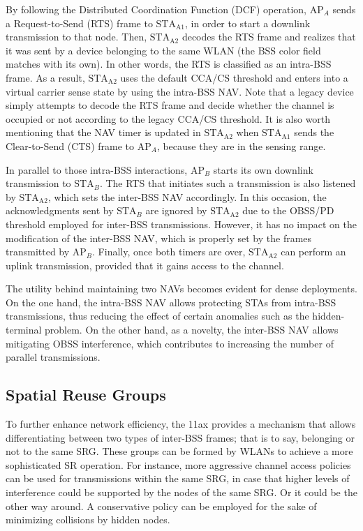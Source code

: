 \documentclass[comsoc]{IEEEtran}
\begin{document}
	By following the Distributed Coordination Function (DCF) operation, $\text{AP}_A$ sends a Request-to-Send (RTS) frame to $\text{STA}_\text{A1}$, in order to start a downlink transmission to that node. Then, $\text{STA}_\text{A2}$ decodes the RTS frame and realizes that it was sent by a device belonging to the same WLAN (the BSS color field matches with its own). In other words, the RTS is classified as an intra-BSS frame. As a result, $\text{STA}_\text{A2}$ uses the default CCA/CS threshold and enters into a virtual carrier sense state by using the intra-BSS NAV. Note that a legacy device simply attempts to decode the RTS frame and decide whether the channel is occupied or not according to the legacy CCA/CS threshold. It is also worth mentioning that the NAV timer is updated in $\text{STA}_\text{A2}$ when $\text{STA}_\text{A1}$ sends the Clear-to-Send (CTS) frame to $\text{AP}_A$, because they are in the sensing range. 
	
	In parallel to those intra-BSS interactions, $\text{AP}_B$ starts its own downlink transmission to $\text{STA}_B$. The RTS that initiates such a transmission is also listened by $\text{STA}_\text{A2}$, which sets the inter-BSS NAV accordingly. In this occasion, the acknowledgments sent by $\text{STA}_B$ are ignored by $\text{STA}_\text{A2}$ due to the OBSS/PD threshold employed for inter-BSS transmissions. However, it has no impact on the modification of the inter-BSS NAV, which is properly set by the frames transmitted by $\text{AP}_B$. Finally, once both timers are over, $\text{STA}_\text{A2}$ can perform an uplink transmission, provided that it gains access to the channel.
	
	The utility behind maintaining two NAVs becomes evident for dense deployments. On the one hand, the intra-BSS NAV allows protecting STAs from intra-BSS transmissions, thus reducing the effect of certain anomalies such as the hidden-terminal problem. On the other hand, as a novelty, the inter-BSS NAV allows mitigating OBSS interference, which contributes to increasing the number of parallel transmissions. 
	
	\subsection{Spatial Reuse Groups}
	\label{section:srg}
	To further enhance network efficiency, the 11ax provides a mechanism that allows differentiating between two types of inter-BSS frames; that is to say, belonging or not to the same SRG. These groups can be formed by WLANs to achieve a more sophisticated SR operation. For instance, more aggressive channel access policies can be used for transmissions within the same SRG, in case that higher levels of interference could be supported by the nodes of the same SRG. Or it could be the other way around. A conservative policy can be employed for the sake of minimizing collisions by hidden nodes. 
	
\end{document}

